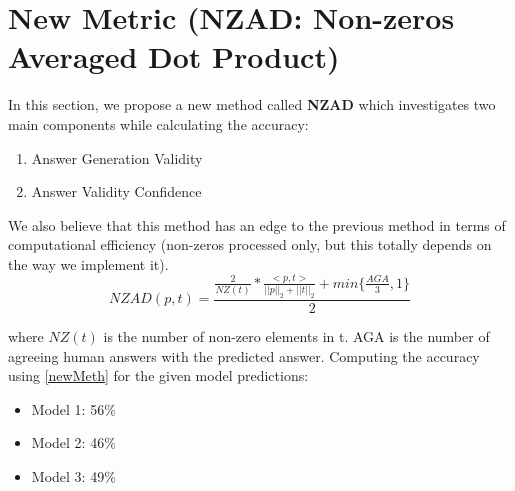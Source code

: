 \documentclass{article}
\begin{document}
\section{New Metric (NZAD: Non-zeros Averaged Dot Product)}
In this section, we propose a new method called \textbf{NZAD} which investigates two main components while calculating the accuracy:
\begin{enumerate}
    \item Answer Generation Validity
    \item Answer Validity Confidence
\end{enumerate}
We also believe that this method has an edge to the previous method in terms of computational efficiency (non-zeros processed only, but this totally depends on the way we implement it).
\begin{equation}
    \label{newMeth}
    NZAD(p, t) = \frac{\frac{2}{NZ(t)} * \frac{<p, t>}{||p||_2 + ||t||_2} + min\{ \frac{AGA}{3}, 1\}}{2}
\end{equation}

where $NZ(t)$ is the number of non-zero elements in t. AGA is the number of agreeing human answers with the predicted answer. Computing the accuracy using \ref{newMeth} for the given model predictions:
\begin{itemize}
    \item Model 1: 56\%
    \item Model 2: 46\%
    \item Model 3: 49\%
\end{itemize}
\end{document}
